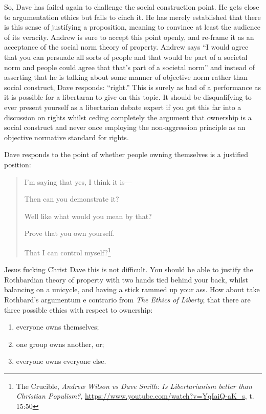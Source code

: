 \documentclass[11pt]{article}
\begin{document}
So, Dave has failed again to challenge the social construction point. He gets close to argumentation ethics but fails to cinch it. He has merely established that there is this sense of justifying a proposition, meaning to convince at least the audience of its veracity. Andrew is sure to accept this point openly, and re-frame it as an acceptance of the social norm theory of property. Andrew says ``I would agree that you can persuade all sorts of people and that would be part of a societal norm and people could agree that that's part of a societal norm'' and instead of asserting that he is talking about some manner of objective norm rather than social construct, Dave responds: ``right.'' This is surely as bad of a performance as it is possible for a libertaran to give on this topic. It should be disqualifying to ever present yourself as a libertarian debate expert if you get this far into a discussion on rights whilst ceding completely the argument that ownership is a social construct and never once employing the non-aggression principle as an objective normative standard for rights.

Dave responds to the point of whether people owning themselves is a justified position:
\begin{quote}
I'm saying that yes, I think it is---

Then can you demonstrate it?

Well like what would you mean by that?

Prove that you own yourself.

That I can control myself?\footnote{The Crucible, \emph{Andrew Wilson vs Dave Smith: Is Libertarianism better than Christian Populism?}, \url{https://www.youtube.com/watch?v=YqIaiQ-aK\_s}, t. 15:50}
\end{quote}

Jesus fucking Christ Dave this is not difficult. You should be able to justify the Rothbardian theory of property with two hands tied behind your back, whilst balancing on a unicycle, and having a stick rammed up your ass. How about take Rothbard's argumentum e contrario from \emph{The Ethics of Liberty}; that there are three possible ethics with respect to ownership:
\begin{enumerate}
\item everyone owns themselves;
\item one group owns another, or;
\item everyone owns everyone else.
\end{enumerate}
\end{document}
